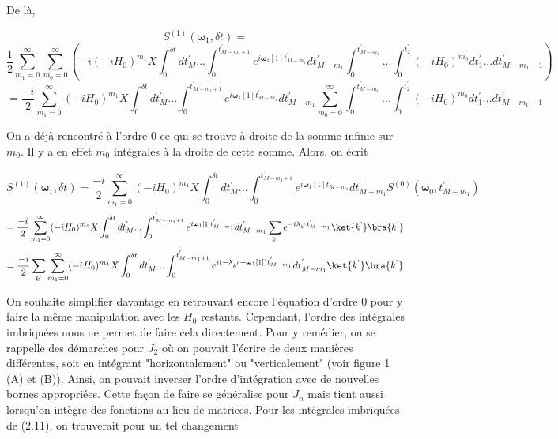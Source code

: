 De là,

\begin{equation*}
    S^{(1)}(\boldsymbol{\omega}_1, \delta t) = 
\end{equation*}
\begin{equation*}
    \frac{1}{2} \sum_{m_1 = 0}^{\infty}\sum_{m_0 = 0}^{\infty}\left(-i (-iH_0)^{m_1}X
    \int_{0}^{\delta t}dt_M^{'} ... \int_{0}^{t^{'}_{M-m_1+1}}e^{i\boldsymbol{\omega}_1[1]t^{'}_{M-m_1}} dt_{M-m_1}^{'}\int_{0}^{t^{'}_{M-m_1}}... \int_{0}^{t_2^{'}}(-iH_0)^{m_0} dt_1^{'} ... dt_{M - m_1 - 1}^{'}\right)
\end{equation*}
\begin{equation*}
    = \frac{-i}{2}\sum_{m_1 = 0}^{\infty}(-iH_0)^{m_1}X\int_{0}^{\delta t}dt^{'}_M ... \int_{0}^{t^{'}_{M-m_1+1}}e^{i\boldsymbol{\omega}_1[1]t^{'}_{M-m_1}} dt_{M-m_1}^{'}\sum_{m_0 = 0}^{\infty}\int_{0}^{t^{'}_{M-m_1}}... \int_{0}^{t_2^{'}}(-iH_0)^{m_0} dt_1^{'} ... dt_{M - m_1 - 1}^{'}
\end{equation*}

On a déjà rencontré à l'ordre 0 ce qui se trouve à droite de la somme infinie sur $m_0$. Il y a en effet $m_0$ intégrales à la droite de cette somme. Alors, on écrit

\begin{equation*}
    S^{(1)}(\boldsymbol{\omega}_1, \delta t) = \frac{-i}{2}\sum_{m_1 = 0}^{\infty}(-iH_0)^{m_1}X\int_{0}^{\delta t}dt^{'}_M ... \int_{0}^{t^{'}_{M-m_1+1}}e^{i\boldsymbol{\omega}_1[1]t^{'}_{M-m_1}} dt_{M-m_1}^{'}S^{(0)}(\boldsymbol{\omega}_0, t^{'}_{M-m_1})
\end{equation*}
\begin{equation*}
    = \frac{-i}{2}\sum_{m_1 = 0}^{\infty}(-iH_0)^{m_1}X\int_{0}^{\delta t}dt^{'}_M ... \int_{0}^{t^{'}_{M-m_1+1}}e^{i\boldsymbol{\omega}_1[1]t^{'}_{M-m_1}} dt_{M-m_1}^{'}\sum_{k^\text{'}}e^{-i\lambda_{k^\text{'}}t^{'}_{M-m_1}}\ket{k^\text{'}}\bra{k^\text{'}}
\end{equation*}
\begin{equation}
    = \frac{-i}{2}\sum_{k^\text{'}}\sum_{m_1 = 0}^{\infty}(-iH_0)^{m_1}X\int_{0}^{\delta t}dt^{'}_M ... \int_{0}^{t^{'}_{M-m_1+1}}e^{i(-\lambda_{k^{'}}+\boldsymbol{\omega}_1[1])t^{'}_{M-m_1}} dt_{M-m_1}^{'}\ket{k^\text{'}}\bra{k^\text{'}}
\end{equation}

On souhaite simplifier davantage en retrouvant encore l'équation d'ordre 0 pour y faire la même manipulation avec les $H_0$ restants. Cependant, l'ordre des intégrales imbriquées nous ne permet de faire cela directement. Pour y remédier, on se rappelle des démarches pour $J_2$ où on pouvait l'écrire de deux manières différentes, soit en intégrant "horizontalement" ou "verticalement" (voir figure 1 (A) et (B)). Ainsi, on pouvait inverser l'ordre d'intégration avec de nouvelles bornes appropriées. Cette façon de faire se généralise pour $J_n$ mais tient aussi lorsqu'on intègre des fonctions au lieu de matrices. Pour les intégrales imbriquées de (2.11), on trouverait pour un tel changement

